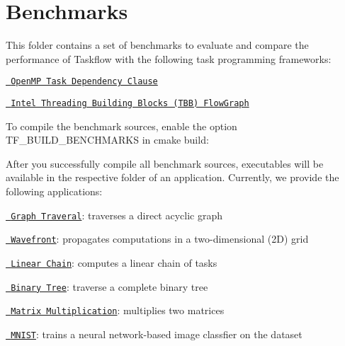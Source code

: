 \chapter{Benchmarks}
\hypertarget{md_external_2taskflow_2benchmarks_2benchmarks}{}\label{md_external_2taskflow_2benchmarks_2benchmarks}
\label{md_external_2taskflow_2benchmarks_2benchmarks_autotoc_md1321}%
%


This folder contains a set of benchmarks to evaluate and compare the performance of Taskflow with the following task programming frameworks\+:


\begin{DoxyItemize}
\item \href{https://www.openmp.org/spec-html/5.0/openmpsu99.html}{\texttt{ Open\+MP Task Dependency Clause}}
\item \href{https://www.threadingbuildingblocks.org/tutorial-intel-tbb-flow-graph}{\texttt{ Intel Threading Building Blocks (TBB) Flow\+Graph}}
\end{DoxyItemize}

To compile the benchmark sources, enable the option {\ttfamily TF\+\_\+\+BUILD\+\_\+\+BENCHMARKS} in cmake build\+:


\begin{DoxyCode}{0}

\end{DoxyCode}


After you successfully compile all benchmark sources, executables will be available in the respective folder of an application. Currently, we provide the following applications\+:


\begin{DoxyItemize}
\item \href{./graph_traversal}{\texttt{ Graph Traveral}}\+: traverses a direct acyclic graph
\item \href{./wavefront}{\texttt{ Wavefront}}\+: propagates computations in a two-\/dimensional (2D) grid
\item \href{./linear_chain}{\texttt{ Linear Chain}}\+: computes a linear chain of tasks
\item \href{./binary_tree}{\texttt{ Binary Tree}}\+: traverse a complete binary tree
\item \href{./matrix_multiplication}{\texttt{ Matrix Multiplication}}\+: multiplies two matrices
\item \href{./mnist}{\texttt{ MNIST}}\+: trains a neural network-\/based image classfier on the  dataset
\end{DoxyItemize}

